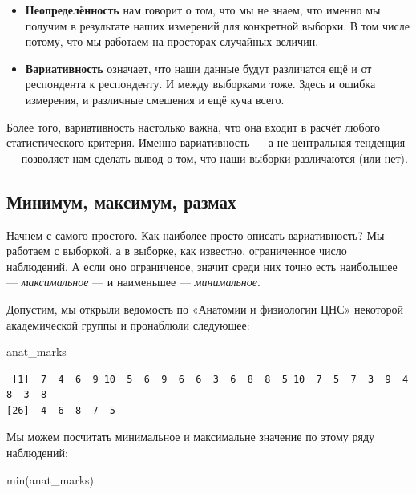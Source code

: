 \documentclass[
  letterpaper,
]{scrbook}
\newenvironment{Shaded}{}{}
\newcommand{\FunctionTok}[1]{\textcolor[rgb]{0.44,0.26,0.76}{#1}}
\newcommand{\NormalTok}[1]{\textcolor[rgb]{0.14,0.16,0.18}{#1}}
\providecommand{\tightlist}{%
  \setlength{\itemsep}{0pt}\setlength{\parskip}{0pt}}\usepackage{longtable,booktabs,array}
\theoremstyle{definition}
\theoremstyle{remark}
\begin{document}
\begin{itemize}
\tightlist
\item
  \textbf{Неопределённость} нам говорит о том, что мы не знаем, что
  именно мы получим в результате наших измерений для конкретной выборки.
  В том числе потому, что мы работаем на просторах случайных величин.
\item
  \textbf{Вариативность} означает, что наши данные будут различатся ещё
  и от респондента к респонденту. И между выборками тоже. Здесь и ошибка
  измерения, и различные смешения и ещё куча всего.
\end{itemize}

Более того, вариативность настолько важна, что она входит в расчёт
любого статистического критерия. Именно вариативность --- а не
центральная тенденция --- позволяет нам сделать вывод о том, что наши
выборки различаются (или нет).

\subsection{Минимум, максимум, размах}\label{andan-descriptives-range}

Начнем с самого простого. Как наиболее просто описать вариативность? Мы
работаем с выборкой, а в выборке, как известно, ограниченное число
наблюдений. А если оно ограниченое, значит среди них точно есть
наибольшее --- \emph{максимальное} --- и наименьшее ---
\emph{минимальное}.

Допустим, мы открыли ведомость по «Анатомии и физиологии ЦНС» некоторой
академической группы и пронаблюли следующее:

\begin{Shaded}
\begin{Highlighting}[]
\NormalTok{anat\_marks}
\end{Highlighting}
\end{Shaded}

\begin{verbatim}
 [1]  7  4  6  9 10  5  6  9  6  6  3  6  8  8  5 10  7  5  7  3  9  4  8  3  8
[26]  4  6  8  7  5
\end{verbatim}

Мы можем посчитать минимальное и максимальне значение по этому ряду
наблюдений:

\begin{Shaded}
\begin{Highlighting}[]
\FunctionTok{min}\NormalTok{(anat\_marks)}
\end{Highlighting}
\end{Shaded}
\end{document}

